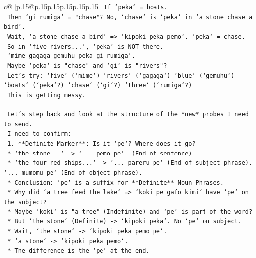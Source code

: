 \documentclass{article}
\begin{document}
{\begin{supertabular}{c@{$\;$}|p{.15\linewidth}@{}p{.15\linewidth}p{.15\linewidth}p{.15\linewidth}p{.15\linewidth}p{.15\linewidth}}
{{{\texttt{                    If `peka` = boats.} \\
\texttt{                    Then `gi rumiga` = "chase"? No, `chase` is `peka` in `a stone chase a bird`.} \\
\texttt{                    Wait, `a stone chase a bird` => `kipoki peka pemo`. `peka` = chase.} \\
\texttt{                    So in `five rivers...`, `peka` is NOT there.} \\
\texttt{                    `mime gagaga gemuhu peka gi rumiga`.} \\
\texttt{                    Maybe `peka` is "chase" and `gi` is "rivers"?} \\
\texttt{                    Let's try: `five` (`mime`) `rivers` (`gagaga`) `blue` (`gemuhu`) `boats` (`peka`?) `chase` (`gi`?) `three` (`rumiga`?)} \\
\texttt{                    This is getting messy.} \\
\\ 
\texttt{                    Let's step back and look at the structure of the *new* probes I need to send.} \\
\texttt{                    I need to confirm:} \\
\texttt{                    1.  **Definite Marker**: Is it `pe`? Where does it go?} \\
\texttt{                        *   `the stone...` {-}> `... pemo pe`. (End of sentence).} \\
\texttt{                        *   `the four red ships...` {-}> `... pareru pe` (End of subject phrase). `... mumomu pe` (End of object phrase).} \\
\texttt{                        *   Conclusion: `pe` is a suffix for **Definite** Noun Phrases.} \\
\texttt{                        *   Why did `a tree feed the lake` => `koki pe gafo kimi` have `pe` on the subject?} \\
\texttt{                        *   Maybe `koki` is "a tree" (Indefinite) and `pe` is part of the word?} \\
\texttt{                        *   But `the stone` (Definite) {-}> `kipoki peka`. No `pe` on subject.} \\
\texttt{                        *   Wait, `the stone` {-}> `kipoki peka pemo pe`.} \\
\texttt{                        *   `a stone` {-}> `kipoki peka pemo`.} \\
\texttt{                        *   The difference is the `pe` at the end.} \\
}}}
\end{supertabular}}
\end{document}
